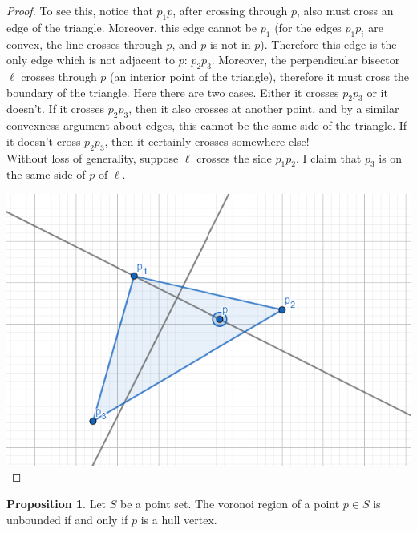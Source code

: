 \documentclass[12pt]{article}
\theoremstyle{definition}
\newtheorem{proposition}{Proposition}
\begin{document}
\begin{proof}
To see this, notice that $p_1p$, after crossing through $p$, also must cross an edge of the triangle. Moreover, this edge cannot be $p_1$ (for the edges $p_1p_i$ are convex, the line crosses through $p$, and $p$ is not in $p$). Therefore this edge is the only edge which is not adjacent to $p$: $p_2p_3$. Moreover, the perpendicular bisector $\ell$ crosses through $p$ (an interior point of the triangle), therefore it must cross the boundary of the triangle. Here there are two cases. Either it crosses $p_2p_3$ or it doesn't. If it crosses $p_2p_3$, then it also crosses at another point, and by a similar convexness argument about edges, this cannot be the same side of the triangle. If it doesn't cross $p_2p_3$, then it certainly crosses somewhere else!\\

Without loss of generality, suppose $\ell$ crosses the side $p_1p_2$. I claim that $p_3$ is on the same side of $p$ of $\ell$. 

\includegraphics[scale=1]{techincal_lemma.png} 
\end{proof}

\begin{proposition}

Let $S$ be a point set. The voronoi region of a point $p\in S$ is unbounded if and only if $p$ is a hull vertex.

\end{proposition}
\end{document}
